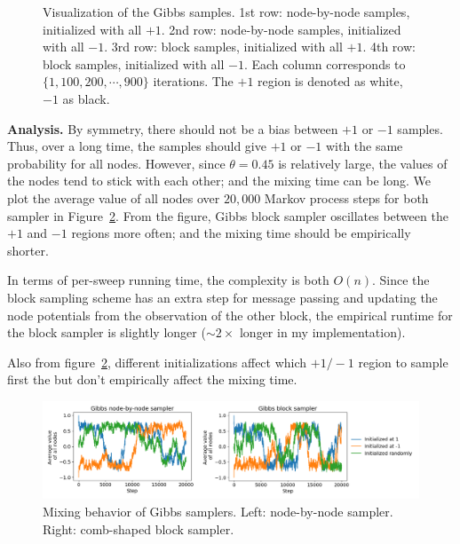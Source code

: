 \documentclass{article}
\begin{document}
\begin{figure}[h]
\begin{subfigure}[t]{0.09\textwidth}
\vspace{-0.6cm}
\end{subfigure}\hspace{0.001\textwidth}
%
\caption{Visualization of the Gibbs samples.
         1st row: node-by-node samples, initialized with all $+1$.
         2nd row: node-by-node samples, initialized with all $-1$.
         3rd row: block samples, initialized with all $+1$.
         4th row: block samples, initialized with all $-1$.
         Each column corresponds to $\{1, 100, 200, \cdots, 900\}$ iterations.
         The $+1$ region is denoted as white, $-1$ as black.}
\label{f:63a}
\end{figure}
%

\noindent
\textbf{Analysis.}
\noindent
By symmetry, there should not be a bias between $+1$ or $-1$ samples.
%
Thus, over a long time, the samples should give $+1$ or $-1$ with the same probability for all nodes.
%
However, since $\theta=0.45$ is relatively large, the values of the nodes tend to stick with each
other; and the mixing time can be long.
%
We plot the average value of all nodes over $20,000$ Markov process steps for both sampler in Figure~\ref{f:63}.
%
From the figure, Gibbs block sampler oscillates between the $+1$ and $-1$ regions more often;
and the mixing time should be empirically shorter. 
%

In terms of per-sweep running time, the complexity is both $O(n)$. Since the block sampling scheme has
an extra step for message passing and updating the node potentials from the observation of the other block,
the empirical runtime for the block sampler is slightly longer ($\sim 2\times$ longer in my implementation).

Also from figure~\ref{f:63}, different initializations affect which $+1/-1$ region to sample first the
but don't empirically affect the mixing time.
\\

\begin{figure}[h]
\centering
\vspace{-0.6cm}
\includegraphics[width=\textwidth]{./63.pdf}
\vspace{-0.8cm}
\caption{Mixing behavior of Gibbs samplers. Left: node-by-node sampler. Right: comb-shaped block sampler.}
\label{f:63}
\end{figure}
\end{document}
